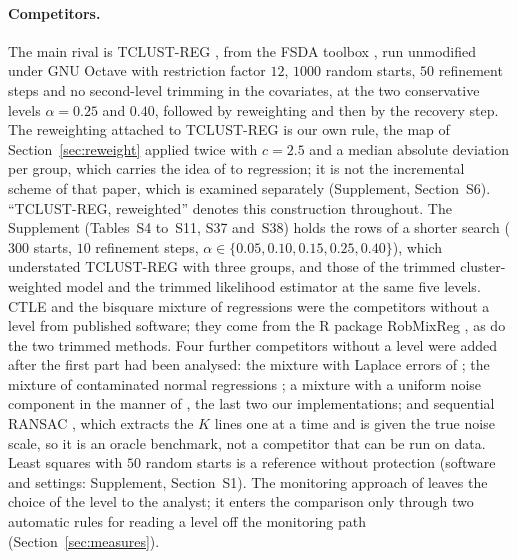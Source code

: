 \paragraph{Competitors.} The main rival is TCLUST-REG \citep{garciaescudero2010robust}, from the
FSDA toolbox \citep{riani2012fsda}, run unmodified under GNU Octave with restriction factor $12$,
$1000$ random starts, $50$ refinement steps and no second-level trimming in the covariates, at
the two conservative levels $\alpha=0.25$ and $0.40$, followed by reweighting and then by the
recovery step. The reweighting attached to TCLUST-REG is our own rule, the map of
Section~\ref{sec:reweight} applied twice with $c=2.5$ and a median absolute deviation per group,
which carries the idea of \citet{dotto2018reweighting} to regression; it is not the incremental
scheme of that paper, which is examined separately (Supplement, Section~S6). ``TCLUST-REG,
reweighted'' denotes this construction throughout. The Supplement (Tables~S4 to~S11, S37
and~S38) holds the rows of a shorter search ($300$ starts, $10$ refinement steps,
$\alpha\in\{0.05,0.10,0.15,0.25,0.40\}$), which understated TCLUST-REG with three groups,
and those of the trimmed cluster-weighted model \citep{garciaescudero2017robust} and the
trimmed likelihood estimator \citep{neykov2007robust} at the same five levels. CTLE
\citep{chang2020componentwise} and the bisquare mixture of regressions \citep{bai2012robust}
were the competitors without a level from published software; they come from the R package
RobMixReg \citep{cao2026robmixreg}, as do the two trimmed methods. Four further competitors without a level were added after the first part had
been analysed: the mixture with Laplace errors of \citet{song2014robust}; the mixture of
contaminated normal regressions \citep{punzo2017robust,mazza2020mixtures}; a mixture with a
uniform noise component in the manner of \citet{banfield1993model}, the last two our
implementations; and sequential RANSAC \citep{fischler1981random}, which extracts the $K$
lines one at a time and is given the true noise scale, so it is an oracle benchmark, not a
competitor that can be run on data. Least squares with $50$ random starts is a reference
without protection (software and settings: Supplement, Section~S1). The monitoring approach
of \citet{torti2019assessing} leaves the choice of the level to the analyst; it enters the
comparison only through two automatic rules for reading a level off the monitoring path
(Section~\ref{sec:measures}).

